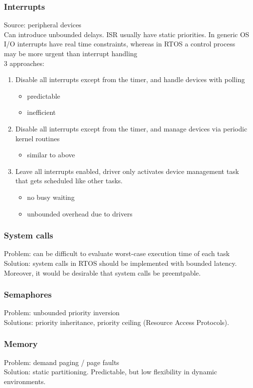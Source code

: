 \documentclass{book}
\begin{document}
\subsubsection{Interrupts}
Source: peripheral devices\\
Can introduce unbounded delays. ISR usually have static priorities. In generic OS I/O interrupts have real time constraints, whereas in RTOS a control process may be more urgent than interrupt handling\\
3 approaches:\begin{enumerate}
    \item Disable all interrupts except from the timer, and handle devices with polling \begin{itemize}
        \item predictable
        \item inefficient
    \end{itemize}
    \item Disable all interrupts except from the timer, and manage devices via periodic kernel routines \begin{itemize}
        \item similar to above
    \end{itemize}
    \item Leave all interrupts enabled, driver only activates device management task that gets scheduled like other tasks. \begin{itemize}
        \item no busy waiting
        \item unbounded overhead due to drivers
    \end{itemize}
\end{enumerate}
\subsubsection{System calls}
Problem: can be difficult to evaluate worst-case execution time of each task\\
Solution: system calls in RTOS should be implemented with bounded latency. Moreover, it would be desirable that system calls be preemtpable.
\subsubsection{Semaphores}
Problem: unbounded priority inversion\\
Solutions: priority inheritance, priority ceiling (Resource Access Protocols).
\subsubsection{Memory}
Problem: demand paging / page faults\\
Solution: static partitioning. Predictable, but low flexibility in dynamic environments.
\end{document}
